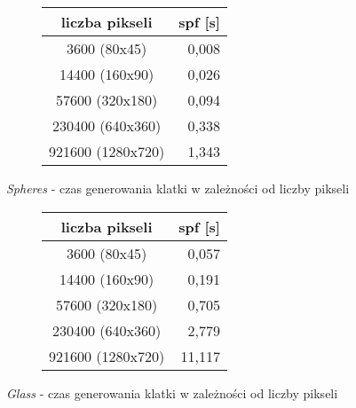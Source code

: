 \begin{figure}[H]
\begin{subfigure}{.5\textwidth}
\end{subfigure}
\begin{subfigure}{.5\textwidth}
		\caption{Tabla z wynikami}
		\begin{longtable}{|c|r|} \hline
	    liczba pikseli & \multicolumn{1}{|c|}{spf [s]} \\ \hline
	    3600 (80x45) & 0,008 \\ 
	    14400 (160x90) & 0,026 \\
		57600 (320x180) & 0,094 \\
		230400 (640x360) & 0,338 \\
		921600 (1280x720) & 1,343 \\
		\hline
		\end{longtable}
\end{subfigure}
\caption{\emph{Spheres} - czas generowania klatki w zależności od liczby pikseli}
\end{figure}
\begin{figure}[H]
\begin{subfigure}{.5\textwidth}
\end{subfigure}
\begin{subfigure}{.5\textwidth}
		\caption{Tabla z wynikami}
		\begin{longtable}{|c|r|} \hline
	    liczba pikseli & \multicolumn{1}{|c|}{spf [s]} \\ \hline
	    3600 (80x45) & 0,057 \\ 
	    14400 (160x90) & 0,191 \\
		57600 (320x180) & 0,705 \\
		230400 (640x360) & 2,779 \\
		921600 (1280x720) & 11,117 \\
		\hline
		\end{longtable}
\end{subfigure}
\caption{\emph{Glass} - czas generowania klatki w zależności od liczby pikseli}
\end{figure}
